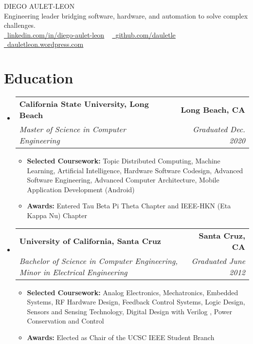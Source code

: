 \documentclass[letterpaper,11pt]{article}
\makeatletter
\newcommand{\resumeItem}[1]{
  \item\small{
    {#1 \vspace{-3pt}}
  }
}
\newcommand{\resumeSubheading}[4]{
  \vspace{-3pt}\item
    \begin{tabular*}{1.0\textwidth}[t]{l@{\extracolsep{\fill}}r}
      \textbf{#1} & \textbf{\small #2} \\
      \textit{\small#3} & \textit{\small #4} \\
    \end{tabular*}\vspace{-7pt}
}
\newcommand{\resumeSubHeadingListStart}{\begin{itemize}[leftmargin=0.0in, label={}]}
\newcommand{\resumeSubHeadingListEnd}{\end{itemize}}
\newcommand{\resumeItemListStart}{\begin{itemize}}
\newcommand{\resumeItemListEnd}{\end{itemize}\vspace{0pt}}
\makeatother
\begin{document}
    \begin{center}
        {\Huge\scshape DIEGO AULET-LEON} 
        \\ Engineering leader bridging software, hardware, and automation to solve complex challenges.\\
        \small
        \href{https://linkedin.com/in/diego-aulet-leon-8b172a13}{\raisebox{-0.2\height}\faLinkedin\ \underline{linkedin.com/in/diego-aulet-leon}}  ~
        \href{https://github.com/dauletle}{\raisebox{-0.2\height}\faGithub\ \underline{github.com/dauletle}}
        \href{https://diegoauletleon.wordpress.com}{\raisebox{-0.2\height}\faHome\ \underline{dauletleon.wordpress.com}}
    \end{center}

\section{Education}
  \resumeSubHeadingListStart
  
    \resumeSubheading
    {California State University, Long Beach}{Long Beach, CA}
    {Master of Science in Computer Engineering}{Graduated Dec. 2020}
        \resumeItemListStart
            \resumeItem{\textbf{Selected Coursework:} Topic Distributed Computing, Machine Learning, Artificial Intelligence, Hardware Software Codesign, Advanced Software Engineering, Advanced Computer Architecture, Mobile Application Development (Android)}
            \resumeItem{\textbf{Awards:} Entered Tau Beta Pi Theta Chapter and IEEE-HKN (Eta Kappa Nu) Chapter}
        \resumeItemListEnd
        
    \resumeSubheading
    {University of California, Santa Cruz}{Santa Cruz, CA}
    {Bachelor of Science in Computer Engineering, Minor in Electrical Engineering}{Graduated June 2012}
        \resumeItemListStart
            \resumeItem{\textbf{Selected Coursework:} Analog Electronics, Mechatronics, Embedded Systems, RF Hardware Design, Feedback Control Systems, Logic Design, Sensors and Sensing Technology, Digital Design with Verilog , Power Conservation and Control}
            \resumeItem{\textbf{Awards:} Elected as Chair of the UCSC IEEE Student Branch}
        \resumeItemListEnd
        
  \resumeSubHeadingListEnd
\end{document}
